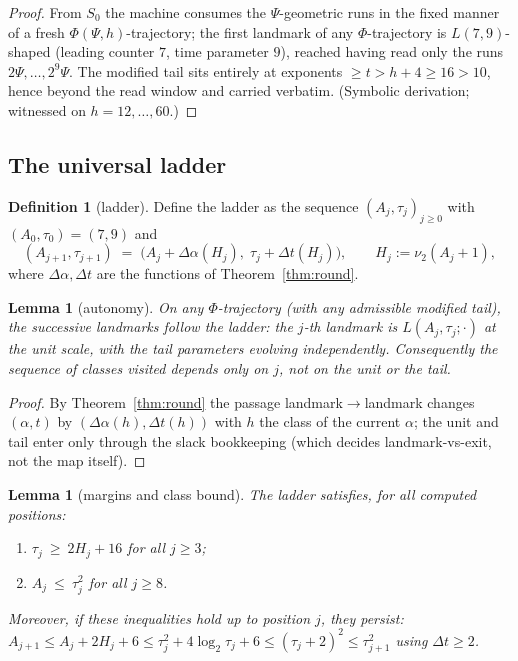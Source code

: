 \documentclass[11pt]{amsart}
\newtheorem{lemma}[theorem]{Lemma}
\theoremstyle{definition}
\newtheorem{definition}[theorem]{Definition}
\newcommand{\vtwo}[1]{\nu_2(#1)}
\begin{document}
\begin{proof}
From $S_0$ the machine consumes the $\Psi$-geometric runs in the fixed
manner of a fresh $\Phi(\Psi,h)$-trajectory; the first landmark of any
$\Phi$-trajectory is $L(7,9)$-shaped (leading counter $7$, time parameter
$9$), reached having read only the runs $2\Psi,\dots,2^{9}\Psi$. The
modified tail sits entirely at exponents $\ge t>h+4\ge16>10$, hence beyond
the read window and carried verbatim. (Symbolic derivation; witnessed on
$h=12,\dots,60$.)
\end{proof}

\subsection{The universal ladder}\label{s:ladder}

\begin{definition}[ladder]\label{def:ladder}
Define the ladder as the sequence $(A_j,\tau_j)_{j\ge0}$ with
$(A_0,\tau_0)=(7,9)$ and
\[
(A_{j+1},\tau_{j+1}) \;=\; \bigl(A_j+\Delta\alpha(H_j),\;\tau_j+\Delta t(H_j)\bigr),
\qquad H_j:=\vtwo{A_j+1},
\]
where $\Delta\alpha,\Delta t$ are the functions of Theorem~\ref{thm:round}.
\end{definition}

\begin{lemma}[autonomy]\label{lem:autonomy}
On any $\Phi$-trajectory (with any admissible modified tail), the
successive landmarks follow the ladder: the $j$-th landmark is
$L(A_j,\tau_j;\cdot)$ at the unit scale, with the tail parameters evolving
independently. Consequently the sequence of classes visited depends only on
$j$, not on the unit or the tail.
\end{lemma}

\begin{proof}
By Theorem~\ref{thm:round} the passage landmark$\to$landmark changes
$(\alpha,t)$ by $(\Delta\alpha(h),\Delta t(h))$ with $h$ the class of the
current $\alpha$; the unit and tail enter only through the slack bookkeeping
(which decides landmark-vs-exit, not the map itself).
\end{proof}

\begin{lemma}[margins and class bound]\label{lem:ladder}
The ladder satisfies, for all computed positions:
\begin{enumerate}
\item $\tau_j\ \ge\ 2H_j+16$ for all $j\ge3$;
\item $A_j\ \le\ \tau_j^{2}$ for all $j\ge8$.
\end{enumerate}
Moreover, if these inequalities hold up to position $j$, they persist:
$A_{j+1}\le A_j+2H_j+6\le\tau_j^{2}+4\log_2\tau_j+6\le(\tau_j+2)^{2}\le\tau_{j+1}^{2}$
using $\Delta t\ge2$.
\end{lemma}
\end{document}
